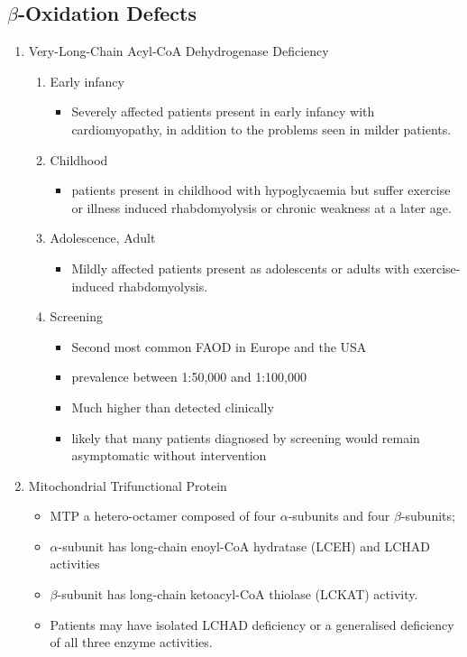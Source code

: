 \documentclass{scrartcl}
\begin{document}
\subsection{\(\beta\)-Oxidation Defects}
\label{sec:org45603d7}
\begin{enumerate}
\item Very-Long-Chain Acyl-CoA Dehydrogenase Deficiency
\label{sec:orga2333cf}
\begin{enumerate}
\item Early infancy
\label{sec:orge679b87}
\begin{itemize}
\item Severely affected patients present in early infancy with
cardiomyopathy, in addition to the problems seen in milder patients.
\end{itemize}

\item Childhood
\label{sec:orgd0835de}
\begin{itemize}
\item patients present in childhood with hypoglycaemia but suffer exercise
or illness induced rhabdomyolysis or chronic weakness at a later age.
\end{itemize}

\item Adolescence, Adult
\label{sec:orge811aeb}
\begin{itemize}
\item Mildly affected patients present as adolescents or adults with
exercise-induced rhabdomyolysis.
\end{itemize}

\item Screening
\label{sec:orgb0994b2}
\begin{itemize}
\item Second most common FAOD in Europe and the USA
\item prevalence between 1:50,000 and 1:100,000
\item Much higher than detected clinically
\item likely that many patients diagnosed by screening would remain
asymptomatic without intervention
\end{itemize}
\end{enumerate}

\item Mitochondrial Trifunctional Protein
\label{sec:org3824e0f}
\begin{itemize}
\item MTP a hetero-octamer composed of four \(\alpha\)-subunits and four \(\beta\)-subunits;
\item \(\alpha\)-subunit has long-chain enoyl-CoA hydratase (LCEH) and LCHAD activities
\item \(\beta\)-subunit has long-chain ketoacyl-CoA thiolase (LCKAT) activity.
\item Patients may have isolated LCHAD deficiency or a generalised deficiency of all three enzyme activities.


\end{itemize}
\end{enumerate}
\end{document}
